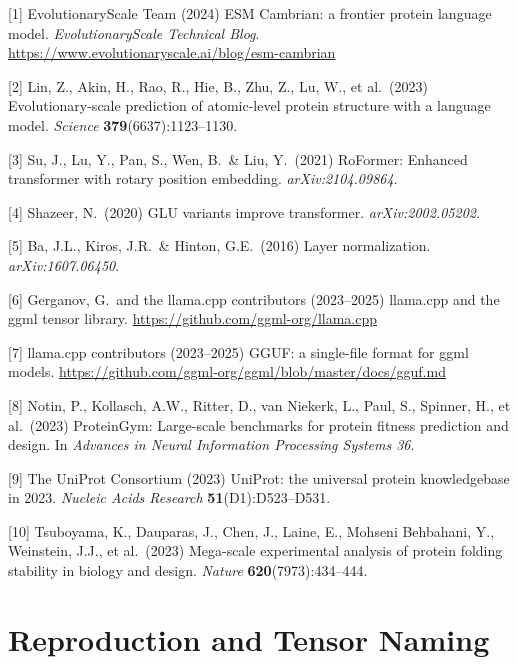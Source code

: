 \documentclass{article}
\begin{document}
\medskip
{
\small

[1] EvolutionaryScale Team (2024) ESM Cambrian: a frontier protein language model. \textit{EvolutionaryScale Technical Blog}. \url{https://www.evolutionaryscale.ai/blog/esm-cambrian}

[2] Lin, Z., Akin, H., Rao, R., Hie, B., Zhu, Z., Lu, W., et al.\ (2023) Evolutionary-scale prediction of atomic-level protein structure with a language model. \textit{Science} \textbf{379}(6637):1123--1130.

[3] Su, J., Lu, Y., Pan, S., Wen, B.\ \& Liu, Y.\ (2021) RoFormer: Enhanced transformer with rotary position embedding. \textit{arXiv:2104.09864}.

[4] Shazeer, N.\ (2020) GLU variants improve transformer. \textit{arXiv:2002.05202}.

[5] Ba, J.L., Kiros, J.R.\ \& Hinton, G.E.\ (2016) Layer normalization. \textit{arXiv:1607.06450}.

[6] Gerganov, G.\ and the llama.cpp contributors (2023--2025) llama.cpp and the ggml tensor library. \url{https://github.com/ggml-org/llama.cpp}

[7] llama.cpp contributors (2023--2025) GGUF: a single-file format for ggml models. \url{https://github.com/ggml-org/ggml/blob/master/docs/gguf.md}

[8] Notin, P., Kollasch, A.W., Ritter, D., van Niekerk, L., Paul, S., Spinner, H., et al.\ (2023) ProteinGym: Large-scale benchmarks for protein fitness prediction and design. In \textit{Advances in Neural Information Processing Systems 36}.

[9] The UniProt Consortium (2023) UniProt: the universal protein knowledgebase in 2023. \textit{Nucleic Acids Research} \textbf{51}(D1):D523--D531.

[10] Tsuboyama, K., Dauparas, J., Chen, J., Laine, E., Mohseni Behbahani, Y., Weinstein, J.J., et al.\ (2023) Mega-scale experimental analysis of protein folding stability in biology and design. \textit{Nature} \textbf{620}(7973):434--444.
}

\appendix
\section{Reproduction and Tensor Naming}
\label{app:repro}
\end{document}
